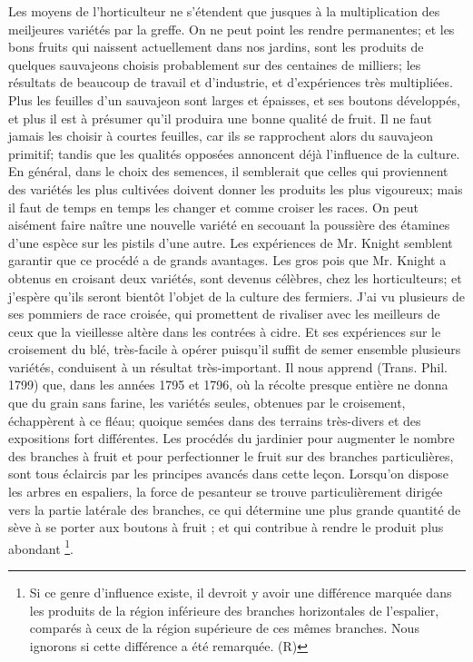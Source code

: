 Les moyens de l'horticulteur ne s'étendent que jusques à la multiplication des meiljeures\setcounter{page}{127} variétés par la greffe. On ne peut point les rendre permanentes; et les bons fruits qui naissent actuellement dans nos jardins, sont les produits de quelques sauvajeons choisis probablement sur des centaines de milliers; les résultats de beaucoup de travail et d'industrie, et d'expériences très multipliées.
Plus les feuilles d'un sauvajeon sont larges et épaisses, et ses boutons développés, et plus il est à présumer qu'il produira une bonne qualité de fruit. Il ne faut jamais les choisir à courtes feuilles, car ils se rapprochent alors du sauvajeon primitif; tandis que les qualités opposées annoncent déjà l'influence de la culture.
En général, dans le choix des semences, il semblerait que celles qui proviennent des variétés les plus cultivées doivent donner les produits les plus vigoureux; mais il faut de temps en temps les changer et comme croiser les races.
On peut aisément faire naître une nouvelle variété en secouant la poussière des étamines d'une espèce sur les pistils d'une autre. Les expériences de Mr. Knight semblent garantir que ce procédé a de grands avantages.
Les gros pois que Mr. Knight a obtenus en croisant deux variétés, sont devenus célèbres,\setcounter{page}{128} chez les horticulteurs; et j'espère qu'ils seront bientôt l'objet de la culture des fermiers.
J'ai vu plusieurs de ses pommiers de race croisée, qui promettent de rivaliser avec les meilleurs de ceux que la vieillesse altère dans les contrées à cidre.
Et ses expériences sur le croisement du blé, très-facile à opérer puisqu'il suffit de semer ensemble plusieurs variétés, conduisent à un résultat très-important. Il nous apprend (Trans. Phil. 1799) que, dans les années 1795 et 1796, où la récolte presque entière ne donna que du grain sans farine, les variétés seules, obtenues par le croisement, échappèrent à ce fléau; quoique semées dans des terrains très-divers et des expositions fort différentes.
Les procédés du jardinier pour augmenter le nombre des branches à fruit et pour perfectionner le fruit sur des branches particulières, sont tous éclaircis par les principes avancés dans cette leçon.
Lorsqu'on dispose les arbres en espaliers, la force de pesanteur se trouve particulièrement dirigée vers la partie latérale des branches, ce qui détermine une plus grande quantité de sève à se porter aux boutons à\setcounter{page}{129} fruit ; et qui contribue à rendre le produit plus abondant \footnote{Si ce genre d'influence existe, il devroit y avoir une différence marquée dans les produits de la région inférieure des branches horizontales de l'espalier, comparés à ceux de la région supérieure de ces mêmes branches. Nous ignorons si cette différence a été remarquée. (R)}.
